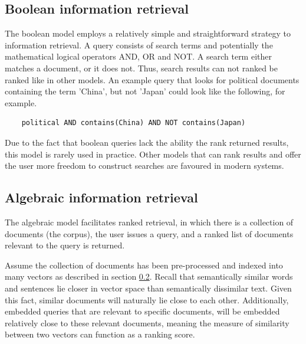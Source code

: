 \documentclass[twoside]{uva-inf-bachelor-thesis}
\begin{document}
\subsection{Boolean information retrieval}
The boolean model employs a relatively simple and straightforward strategy to information retrieval. A query consists of search terms and potentially the mathematical logical operators AND, OR and NOT. A search term either matches a document, or it does not. Thus, search results can not ranked be ranked like in other models.\cite{goker2009information, manning08IR} An example query that looks for political documents containing the term 'China', but not 'Japan' could look like the following, for example.
\begin{verbatim}
    political AND contains(China) AND NOT contains(Japan)
\end{verbatim}
Due to the fact that boolean queries lack the ability the rank returned results, this model is rarely used in practice. Other models that can rank results and offer the user more freedom to construct searches are favoured in modern systems.

\subsection{Algebraic information retrieval}
The algebraic model facilitates ranked retrieval, in which there is a collection of documents (the corpus), the user issues a query, and a ranked list of documents relevant to the query is returned.

Assume the collection of documents has been pre-processed and indexed into many vectors as described in section \ref{}. Recall that semantically similar words and sentences lie closer in vector space than semantically dissimilar text. Given this fact, similar documents will naturally lie close to each other. Additionally, embedded queries that are relevant to specific documents, will be embedded relatively close to these relevant documents, meaning the measure of similarity between two vectors can function as a ranking score.
\end{document}
